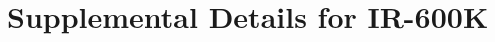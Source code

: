 \documentclass[11pt]{article}
\begin{document}



\section{Supplemental Details for IR-600K}
\label{appendix:dataset}
\end{document}
